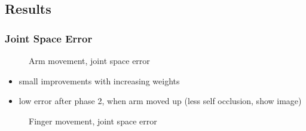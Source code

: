 \subsection{Results}

\subsubsection{Joint Space Error}

\begin{figure}
\centering
{}
\caption{Arm movement, joint space error}
\end{figure}

\begin{itemize}
\item small improvements with increasing weights
\item low error after phase 2, when arm moved up (less self occlusion, show image)
\end{itemize}


\begin{figure}
\centering
{}
\caption{Finger movement, joint space error}
\end{figure}

